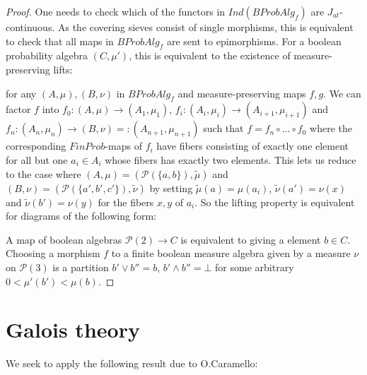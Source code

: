 \documentclass[a4paper,draft]{amsproc}
\theoremstyle{plain}
\theoremstyle{definition}
\theoremstyle{remark}
\numberwithin{equation}{section}
\begin{document}
\begin{proof} One needs to check which of the functors in $Ind(BProbAlg_f)$ are $J_{at}$-continuous. As the covering sieves consist of single morphisms, this is equivalent to check that all maps in $BProbAlg_f$ are sent to epimorphisms. For a boolean probability algebra $(C,\mu')$, this is equivalent to the existence of measure-preserving lifts:
\begin{center}
\end{center}
for any $(A,\mu), (B,\nu)$ in $BProbAlg_f$ and measure-preserving maps $f,g$. We can factor $f$ into $f_0:(A,\mu)\rightarrow (A_1,\mu_1)$, $f_i: (A_i,\mu_i)\rightarrow (A_{i+1},\mu_{i+1})$ and $f_n: (A_n,\mu_n)\rightarrow (B,\nu)=:(A_{n+1},\mu_{n+1})$ such that $f=f_n\circ ...\circ f_0$ where the corresponding $FinProb$-maps of $f_i$ have fibers consisting of exactly one element for all but one $a_i\in A_{i}$ whose fibers has exactly two elements. 
\newline
\indent This lets us reduce to the case where $(A,\mu)=(\mathcal{P}(\{a,b \}),\tilde{\mu})$ and $(B,\nu)=(\mathcal{P}(\{a',b',c'\}),\tilde{\nu})$ by setting $\tilde{\mu}(a)=\mu(a_i)$, $\tilde{\nu}(a')=\nu(x)$ and $\tilde{\nu}(b')=\nu(y)$ for the fibers $x,y$ of $a_i$. So the lifting property is equivalent for diagrams of the following form:
\begin{center}
\end{center}
A map of boolean algebras $\mathcal{P}(2)\rightarrow C$ is equivalent to giving a element $b\in C$. Choosing a morphism $f$ to a finite boolean measure algebra given by a measure $\nu$ on $\mathcal{P}(3)$ is a partition $b'\vee b''=b$, $b'\wedge b''=\bot$ for some arbitrary $0<\mu'(b')<\mu(b)$.
\end{proof}


\section{Galois theory}
We seek to apply the following result due to O.Caramello:
\end{document}
